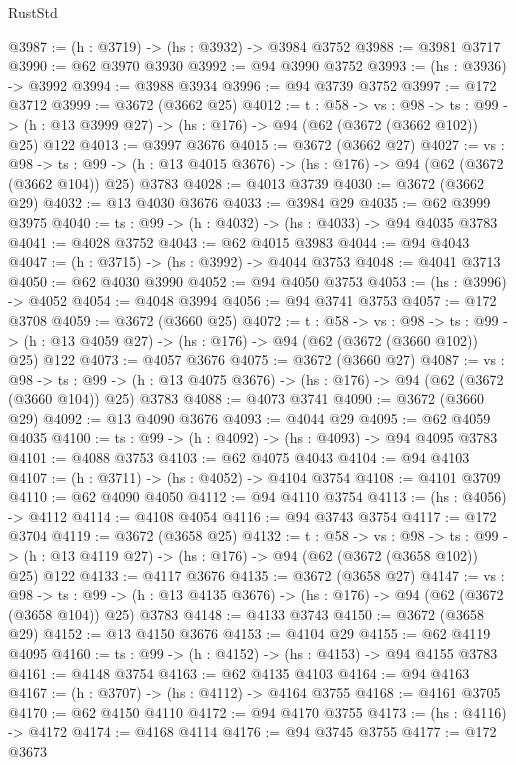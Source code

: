 \begin{lexlean}{RustStd}
\begin{coremodule}
{\begin{coremodule}
{{{{{{{{{@3987 := (h : @3719) -> (hs : @3932) -> @3984 @3752
@3988 := @3981 @3717
@3990 := @62 @3970 @3930
@3992 := @94 @3990 @3752
@3993 := (hs : @3936) -> @3992
@3994 := @3988 @3934
@3996 := @94 @3739 @3752
@3997 := @172 @3712
@3999 := @3672 (@3662 @25)
@4012 := {t : @58} ->
  {vs : @98} ->
  {ts : @99} -> (h : @13 @3999 @27) -> (hs : @176) -> @94 (@62 (@3672 (@3662 @102)) @25) @122
@4013 := @3997 @3676
@4015 := @3672 (@3662 @27)
@4027 := {vs : @98} ->
  {ts : @99} -> (h : @13 @4015 @3676) -> (hs : @176) -> @94 (@62 (@3672 (@3662 @104)) @25) @3783
@4028 := @4013 @3739
@4030 := @3672 (@3662 @29)
@4032 := @13 @4030 @3676
@4033 := @3984 @29
@4035 := @62 @3999 @3975
@4040 := {ts : @99} -> (h : @4032) -> (hs : @4033) -> @94 @4035 @3783
@4041 := @4028 @3752
@4043 := @62 @4015 @3983
@4044 := @94 @4043
@4047 := (h : @3715) -> (hs : @3992) -> @4044 @3753
@4048 := @4041 @3713
@4050 := @62 @4030 @3990
@4052 := @94 @4050 @3753
@4053 := (hs : @3996) -> @4052
@4054 := @4048 @3994
@4056 := @94 @3741 @3753
@4057 := @172 @3708
@4059 := @3672 (@3660 @25)
@4072 := {t : @58} ->
  {vs : @98} ->
  {ts : @99} -> (h : @13 @4059 @27) -> (hs : @176) -> @94 (@62 (@3672 (@3660 @102)) @25) @122
@4073 := @4057 @3676
@4075 := @3672 (@3660 @27)
@4087 := {vs : @98} ->
  {ts : @99} -> (h : @13 @4075 @3676) -> (hs : @176) -> @94 (@62 (@3672 (@3660 @104)) @25) @3783
@4088 := @4073 @3741
@4090 := @3672 (@3660 @29)
@4092 := @13 @4090 @3676
@4093 := @4044 @29
@4095 := @62 @4059 @4035
@4100 := {ts : @99} -> (h : @4092) -> (hs : @4093) -> @94 @4095 @3783
@4101 := @4088 @3753
@4103 := @62 @4075 @4043
@4104 := @94 @4103
@4107 := (h : @3711) -> (hs : @4052) -> @4104 @3754
@4108 := @4101 @3709
@4110 := @62 @4090 @4050
@4112 := @94 @4110 @3754
@4113 := (hs : @4056) -> @4112
@4114 := @4108 @4054
@4116 := @94 @3743 @3754
@4117 := @172 @3704
@4119 := @3672 (@3658 @25)
@4132 := {t : @58} ->
  {vs : @98} ->
  {ts : @99} -> (h : @13 @4119 @27) -> (hs : @176) -> @94 (@62 (@3672 (@3658 @102)) @25) @122
@4133 := @4117 @3676
@4135 := @3672 (@3658 @27)
@4147 := {vs : @98} ->
  {ts : @99} -> (h : @13 @4135 @3676) -> (hs : @176) -> @94 (@62 (@3672 (@3658 @104)) @25) @3783
@4148 := @4133 @3743
@4150 := @3672 (@3658 @29)
@4152 := @13 @4150 @3676
@4153 := @4104 @29
@4155 := @62 @4119 @4095
@4160 := {ts : @99} -> (h : @4152) -> (hs : @4153) -> @94 @4155 @3783
@4161 := @4148 @3754
@4163 := @62 @4135 @4103
@4164 := @94 @4163
@4167 := (h : @3707) -> (hs : @4112) -> @4164 @3755
@4168 := @4161 @3705
@4170 := @62 @4150 @4110
@4172 := @94 @4170 @3755
@4173 := (hs : @4116) -> @4172
@4174 := @4168 @4114
@4176 := @94 @3745 @3755
@4177 := @172 @3673
}}}}}}}}}
\end{coremodule}}
\end{coremodule}
\end{lexlean}
